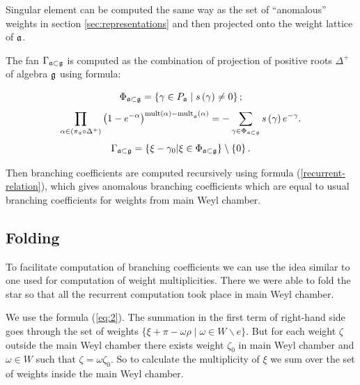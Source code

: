\documentclass[a4paper,12pt]{article}
\theoremstyle{definition} \newtheorem{Def}{Definition}
\begin{document}
Singular element can be computed the same way as the set of ``anomalous''
weights in section \ref{sec:representations} and then projected onto
the weight lattice of $\frak{a}$. 

The fan $\Gamma_{\frak{a}\subset \frak{g}}$ is computed as the
combination of projection of positive roots $\Delta^{+}$ of algebra
$\frak{g}$ using formula:

\begin{equation}
  \label{phi-d}
  \Phi _{\frak{a}\subset \frak{g}}=\left\{ \gamma \in P_{\frak{a}}\mid s\left(
      \gamma \right) \neq 0\right\} ;  
\end{equation}
\begin{equation}
  \label{fan-d}
  \prod_{\alpha \in \left( \pi _{\frak{a}}\circ \Delta ^{+}\right) }\left(
    1-e^{-\alpha }\right) ^{\mathrm{{mult}\left( \alpha \right) -{mult}}_{\frak{a%
      }}\mathrm{\left( \alpha \right) }}=-\sum_{\gamma \in \Phi _{\frak{a}\subset 
      \frak{g}}}s\left( \gamma \right) e^{-\gamma }.  
\end{equation}
\begin{equation}
  \label{fan-defined}
  \Gamma_{\frak{a}\subset \frak{g}}=\left\{ \xi -\gamma _{0}|\xi \in \Phi _{%
      \frak{a}\subset \frak{g}}\right\} \setminus \left\{ 0\right\} .
\end{equation}

Then branching coefficients are computed recursively using formula
(\ref{recurrent-relation}), which gives anomalous branching
coefficients which are equal to usual branching coefficients for
weights from main Weyl chamber. 

\subsection{Folding}
\label{sec:folding}

To facilitate computation of branching coefficients we can use the
idea similar to one used for computation of weight multiplicities.
There we were able to fold the star so that all the recurrent
computation took place in main Weyl chamber. 

We use the formula (\ref{eq:2}). The summation in the first term of
right-hand side goes through the set of weights $\{\xi+\pi-\omega
\rho\;|\;\omega\in W\backslash e\}$.
But for each weight $\zeta$ outside the main Weyl chamber there exists
weight $\zeta_0$ in main Weyl chamber and $\omega\in W$ such that
$\zeta=\omega \zeta_0$. So to calculate the multiplicity of $\xi$ we
sum over the set of weights inside the main Weyl chamber.
\end{document}
